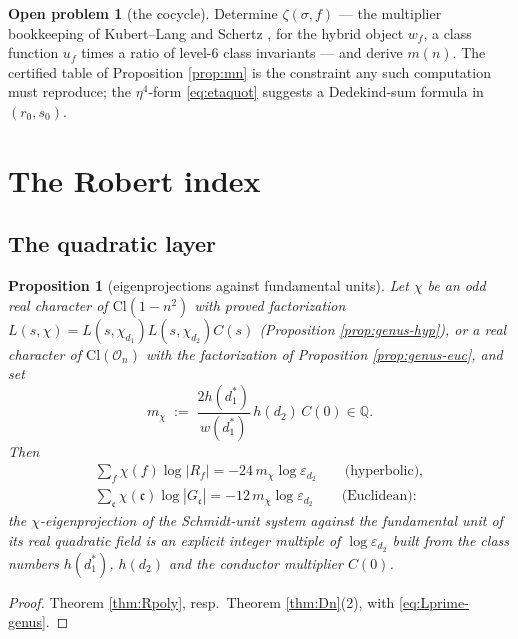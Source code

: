 \documentclass[11pt]{amsart}
\numberwithin{equation}{section}
\theoremstyle{plain}
\newtheorem{proposition}[theorem]{Proposition}
\theoremstyle{definition}
\newtheorem{openproblem}[theorem]{Open problem}
\theoremstyle{remark}
\newcommand{\Q}{\mathbb{Q}}
\newcommand{\Cl}{\mathrm{Cl}}
\newcommand{\idealc}{\mathfrak{c}}
\newcommand{\Oc}{\mathcal{O}}
\newcommand{\eps}{\varepsilon}
\begin{document}
\begin{openproblem}[the cocycle]\label{op:cocycle}
Determine $\zeta(\sigma, f)$ --- the multiplier bookkeeping of
Kubert--Lang and Schertz \cite[Ch.~11]{KubertLang1981}, \cite{Schertz2010}
for the hybrid object $w_f$, a class function $u_f$ times a ratio of level-$6$
class invariants --- and derive $m(n)$.  The certified table of
Proposition \ref{prop:mn} is the constraint any such computation must
reproduce; the $\eta^4$-form \eqref{eq:etaquot} suggests a Dedekind-sum
formula in $(r_0, s_0)$.
\end{openproblem}

\section{The Robert index}\label{sec:robert}

\subsection{The quadratic layer}\label{subsec:quadratic}

\begin{proposition}[eigenprojections against fundamental units]
\label{prop:quadlayer}
Let $\chi$ be an odd real character of $\Cl(1 - n^2)$ with proved
factorization $L(s,\chi) = L(s,\chi_{d_1})L(s,\chi_{d_2})C(s)$
(Proposition \ref{prop:genus-hyp}), or a real character of $\Cl(\Oc_n)$
with the factorization of Proposition \ref{prop:genus-euc}, and set
\[
  m_\chi \;:=\; \frac{2h(d_1^*)}{w(d_1^*)}\,h(d_2)\,C(0) \in \Q .
\]
Then
\begin{gather*}
  \sum_f\chi(f)\log|R_f| = -24\,m_\chi\log\eps_{d_2}
  \qquad\text{(hyperbolic)},\\
  \sum_\idealc\chi(\idealc)\log|G_\idealc| = -12\,m_\chi\log\eps_{d_2}
  \qquad\text{(Euclidean)} :
\end{gather*}
the $\chi$-eigenprojection of the Schmidt-unit system against the
fundamental unit of its real quadratic field is an explicit integer
multiple of $\log\eps_{d_2}$ built from the class numbers $h(d_1^*)$,
$h(d_2)$ and the conductor multiplier $C(0)$.
\end{proposition}

\begin{proof}
Theorem \ref{thm:Rpoly}, resp.\ Theorem \ref{thm:Dn}(2), with
\eqref{eq:Lprime-genus}.
\end{proof}
\end{document}
